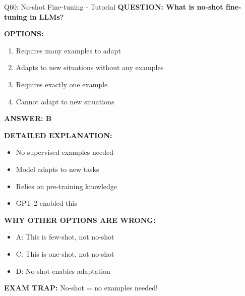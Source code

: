 \documentclass[8pt]{beamer}
\begin{document}
	\begin{frame}{Q60: No-shot Fine-tuning - Tutorial}
		\fontsize{6.5}{7.5}\selectfont
		\textbf{QUESTION: What is no-shot fine-tuning in LLMs?}
		
		\vspace{0.1cm}
		\textbf{OPTIONS:}
		\begin{enumerate}
			\item Requires many examples to adapt
			\item Adapts to new situations without any examples
			\item Requires exactly one example
			\item Cannot adapt to new situations
		\end{enumerate}
		
		\vspace{0.1cm}
		\textcolor{myblue}{\textbf{ANSWER: B}}
		
		\vspace{0.1cm}
		\textbf{DETAILED EXPLANATION:}
		\begin{itemize}
			\item No supervised examples needed
			\item Model adapts to new tasks
			\item Relies on pre-training knowledge
			\item GPT-2 enabled this
		\end{itemize}
		
		\vspace{0.1cm}
		\textcolor{myred}{\textbf{WHY OTHER OPTIONS ARE WRONG:}}
		\begin{itemize}
			\item \textcolor{myred}{A:} This is few-shot, not no-shot
			\item \textcolor{myred}{C:} This is one-shot, not no-shot
			\item \textcolor{myred}{D:} No-shot enables adaptation
		\end{itemize}
		
		\textcolor{myred}{\textbf{EXAM TRAP:}} No-shot = \textcolor{myblue}{no examples needed}!
	\end{frame}
	
\end{document}
